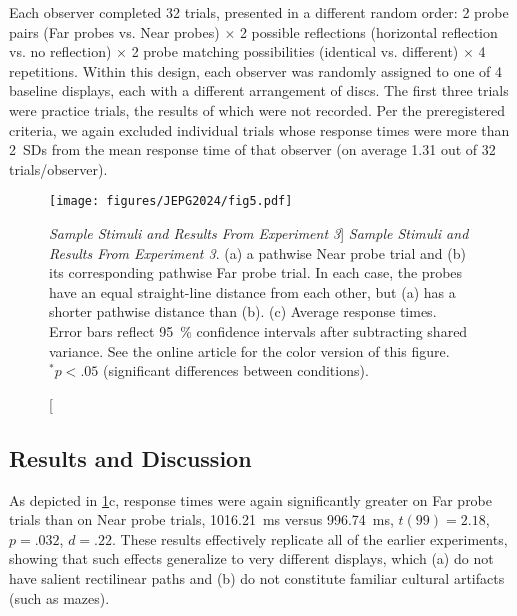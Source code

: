 Each observer completed 32 trials, presented in a different random order: 2 probe pairs (Far probes vs. Near probes) $\times$ 2 possible reflections (horizontal reflection vs. no reflection) $\times$ 2 probe matching possibilities (identical vs. different) $\times$ 4 repetitions. Within this design, each observer was randomly assigned to one of 4 baseline displays, each with a different arrangement of discs. The first three trials were practice trials, the results of which were not recorded. Per the preregistered criteria, we again excluded individual trials whose response times were more than \qty{2}{SD}s from the mean response time of that observer (on average 1.31 out of 32 trials/observer).
\begin{figure}
    \centering
    \texttt{[image: figures/JEPG2024/fig5.pdf]}
    \caption
    [\textit{Sample Stimuli and Results From Experiment 3}]
    {\textit{Sample Stimuli and Results From Experiment 3}. (a) a pathwise Near probe trial and (b) its corresponding pathwise Far probe trial. In each case, the probes have an equal straight-line distance from each other, but (a) has a shorter pathwise distance than (b). (c) Average response times. Error bars reflect \qty{95}{\percent} confidence intervals after subtracting shared variance. See the online article for the color version of this figure. $^{*}p < .05$ (significant differences between conditions).}
    \label{fig:JEPG2024_5}
\end{figure}

\subsection{Results and Discussion}

As depicted in \cref{fig:JEPG2024_5}c, response times were again significantly greater on Far probe trials than on Near probe trials, \qty{1016.21}{\milli\second} versus \qty{996.74}{\milli\second}, $t (99) = 2.18$, $p = .032$, $d = .22$. These results effectively replicate all of the earlier experiments, showing that such effects generalize to very different displays, which (a) do not have salient rectilinear paths and (b) do not constitute familiar cultural artifacts (such as mazes).


